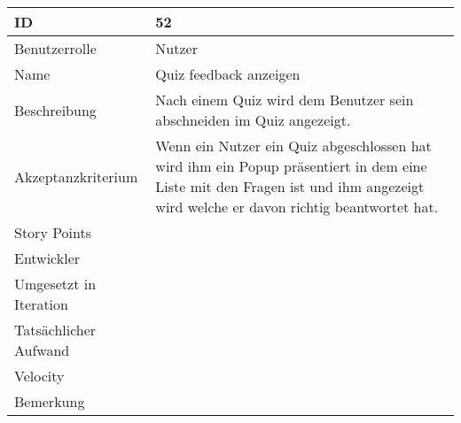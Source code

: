 \begin{tabularx}{\textwidth}{|p{}|X|}
	\hline
	ID & 52\\
	\hline
	Benutzerrolle & Nutzer\\
	\hline
	Name & Quiz feedback anzeigen\\
	\hline
	Beschreibung & Nach einem Quiz wird dem Benutzer sein abschneiden im Quiz angezeigt.\\
	\hline
	Akzeptanzkriterium & Wenn ein Nutzer ein Quiz abgeschlossen hat wird ihm ein Popup präsentiert in dem eine Liste mit den Fragen ist und ihm angezeigt wird welche er davon richtig beantwortet hat. \\
	\hline
	Story Points & \\
	\hline
	Entwickler & \\
	\hline
	Umgesetzt in Iteration & \\
	\hline
	Tatsächlicher Aufwand & \\
	\hline
	Velocity & \\
	\hline
	Bemerkung & \\
	\hline
\end{tabularx}
\vspace{20pt}
